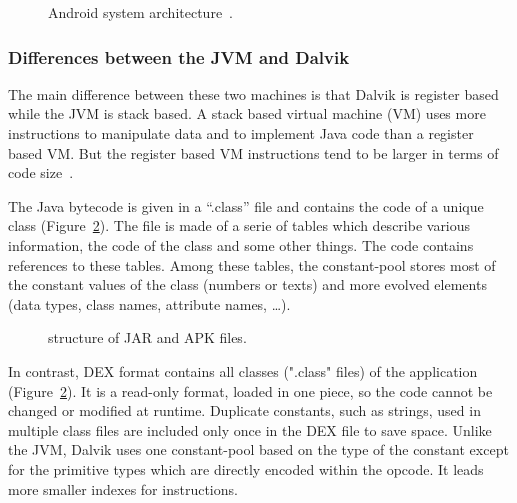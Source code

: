 \documentclass{sig-alternate}
\def \DALVIK{Dalvik\xspace}
\def \ANDROID{Android\xspace}
\def \JVM{JVM\xspace}
\def \DEX{DEX\xspace}
\begin{document}
    \begin{figure}[!ht]
      \centering \resizebox{\linewidth}{!}{}
      \caption{\ANDROID system architecture~\cite{wiki-android}.}\vspace{-1em}
      \label{ASA}
    \end{figure}

    \subsubsection{Differences between the JVM and \DALVIK}

      The main difference between these two machines is that \DALVIK is register based while the \JVM is stack based.
      A stack based virtual machine (VM) uses more instructions to manipulate data and to implement Java code than a register based VM.
      But the register based VM instructions tend to be larger in terms of code size~\cite{ieee-paul-kundu-energy-perspective}.

      The Java bytecode is given in a ``.class'' file and contains the code of a unique class (Figure~\ref{SJA}).
      The file is made of a serie of tables which describe various information, the code of the class and some other things.
      The code contains references to these tables.
      Among these tables, the constant-pool stores most of the constant values of the class (numbers or texts)
      and more evolved elements (data types, class names, attribute names, \dots).

      \begin{figure}[!ht]
        \centering \resizebox{\linewidth}{!}{}
        \caption{structure of JAR and APK files.}\vspace{-.5em}
        \label{SJA}
      \end{figure}

      In contrast, \DEX format contains all classes (".class" files) of the application (Figure~\ref{SJA}).
      It is a read-only format, loaded in one piece, so the code cannot be changed or modified at runtime.
      Duplicate constants, such as strings, used in multiple class files
      are included only once in the \DEX file to save space.
      Unlike the \JVM, \DALVIK uses one constant-pool based on the type of the constant
      except for the primitive types which are directly encoded within the opcode.
      It leads more smaller indexes for instructions.\\
\end{document}
